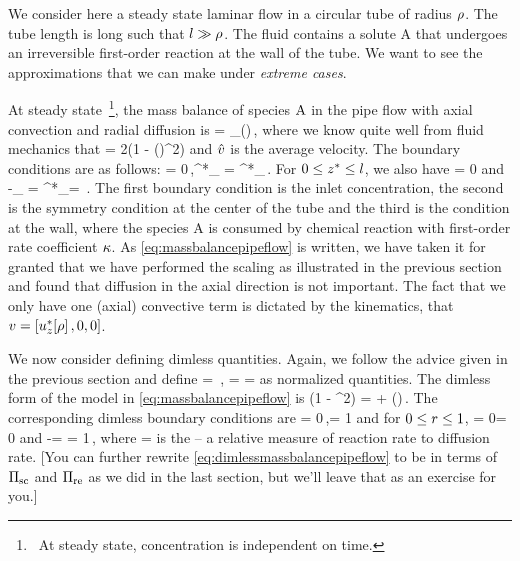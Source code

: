 We consider here a steady state laminar flow in a circular tube of radius $\rho$. The tube length is long such that $l\gg\rho$. The fluid contains a solute \ce A that undergoes an irreversible first-order reaction at the wall of the tube. We want to see the approximations that we can make under \emph{extreme cases}.

At steady state~\footnote{~At steady state, concentration is independent on time.}, the mass balance of species $\ce A$ in the pipe flow with axial convection and radial diffusion is
\bneq\label{eq:massbalancepipeflow}
\vela{} = \kmdiff_\left(\xpd{}{\posr}{\posr}\right)\,,
\eneq
where we know quite well from fluid mechanics that
\beq
\vela = 2\hat{\lvel}\left(1 - \left(\dfrac{\posr}{\rradius}\right)^2\right)
\eeq
and $\hat{v}$ is the average velocity. The boundary conditions are as follows:
\bneq\label{eq:boundaryconditionsmassbalancepipeflow}
 \posz = 0\,,\quad\conc^*_ = \conc^*_\quad{}\posr\rradius\,.
\eneq
For ${0}\leq{z^*}\leq{l}$, we also have
\beq
{}\quad{}\posr = 0
\eeq
and
\beq
-\kmdiff_ = \kforcoeff\conc^*_\quad{}\posr = \rradius\,.
\eeq
The first boundary condition is the inlet concentration, the second is the symmetry condition at the center of the tube and the third is the condition at the wall, where the species \ce A is consumed by chemical reaction with first-order rate coefficient $\kappa$. As \cref{eq:massbalancepipeflow} is written, we have taken it for granted that we have performed the scaling as illustrated in the previous section and found that diffusion in the axial direction is not important. The fact that we only have one (axial) convective term is dictated by the kinematics, that $v = \left[{u^*_z\!\left[{\rho}\right],0,0}\right]$.

We now consider defining dimless quantities. Again, we follow the advice given in the previous section and define
\beq
\conc = \,,\quad
\ndposr = \dfrac{\posr}{\rradius}\quad{}\quad
\ndposz = \dfrac{\posz}{\length}
\eeq
as normalized quantities. The dimless form of the model in \cref{eq:massbalancepipeflow} is
\bneq\label{eq:dimlessmassbalancepipeflow}
\left(1 - \ndposr^2\right) \xpd{\conc}{\ndposz} = 
     +
    \left(\xpd{}\ndposr\ndposr\xpd\conc\ndposr\right)\,.
\eneq
The corresponding dimless boundary conditions are
\beq
{}\ndposz = 0\,,\quad\conc = 1\quad{}
\eeq
and for ${0}\leq{r}\leq{1}$,
\beq
\xpd\conc\ndposr = 0\quad{}\ndposr = 0
\eeq
and
\bneq\label{eq:dimlessconcentrationgradient}
-\xpd\conc\ndposr = \kdamkohler\conc\quad{}\ndposr = 1\,,
\eneq
where
\beq
\kdamkohler = 
\eeq
is the  -- a relative measure of reaction rate to diffusion rate. [You can further rewrite \cref{eq:dimlessmassbalancepipeflow} to be in terms of $\Pi_\text{sc}$ and $\Pi_\text{re}$ as we did in the last section, but we'll leave that as an exercise for you.]

